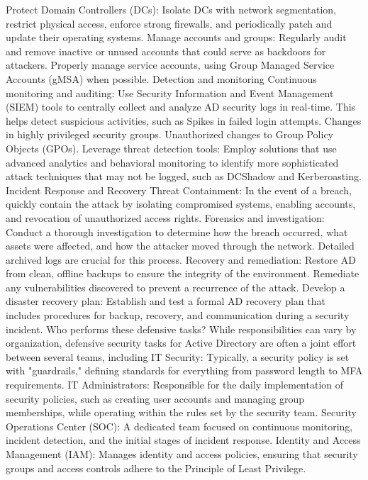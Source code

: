 Protect Domain Controllers (DCs): Isolate DCs with network segmentation, restrict physical access, enforce strong firewalls, and periodically patch and update their operating systems.
Manage accounts and groups: Regularly audit and remove inactive or unused accounts that could serve as backdoors for attackers. Properly manage service accounts, using Group Managed Service Accounts (gMSA) when possible. 
Detection and monitoring
Continuous monitoring and auditing: Use Security Information and Event Management (SIEM) tools to centrally collect and analyze AD security logs in real-time. This helps detect suspicious activities, such as
Spikes in failed login attempts.
Changes in highly privileged security groups.
Unauthorized changes to Group Policy Objects (GPOs).
Leverage threat detection tools: Employ solutions that use advanced analytics and behavioral monitoring to identify more sophisticated attack techniques that may not be logged, such as DCShadow and Kerberoasting. 
Incident Response and Recovery Threat Containment: In the event of a breach, quickly contain the attack by isolating compromised systems, enabling accounts, and revocation of unauthorized access rights.
Forensics and investigation: Conduct a thorough investigation to determine how the breach occurred, what assets were affected, and how the attacker moved through the network. Detailed archived logs are crucial for this process.
Recovery and remediation: Restore AD from clean, offline backups to ensure the integrity of the environment. Remediate any vulnerabilities discovered to prevent a recurrence of the attack.
Develop a disaster recovery plan: Establish and test a formal AD recovery plan that includes procedures for backup, recovery, and communication during a security incident. 
Who performs these defensive tasks?
While responsibilities can vary by organization, defensive security tasks for Active Directory are often a joint effort between several teams, including
IT Security: Typically, a security policy is set with "guardrails," defining standards for everything from password length to MFA requirements.
IT Administrators: Responsible for the daily implementation of security policies, such as creating user accounts and managing group memberships, while operating within the rules set by the security team.
Security Operations Center (SOC): A dedicated team focused on continuous monitoring, incident detection, and the initial stages of incident response.
Identity and Access Management (IAM): Manages identity and access policies, ensuring that security groups and access controls adhere to the Principle of Least Privilege.

